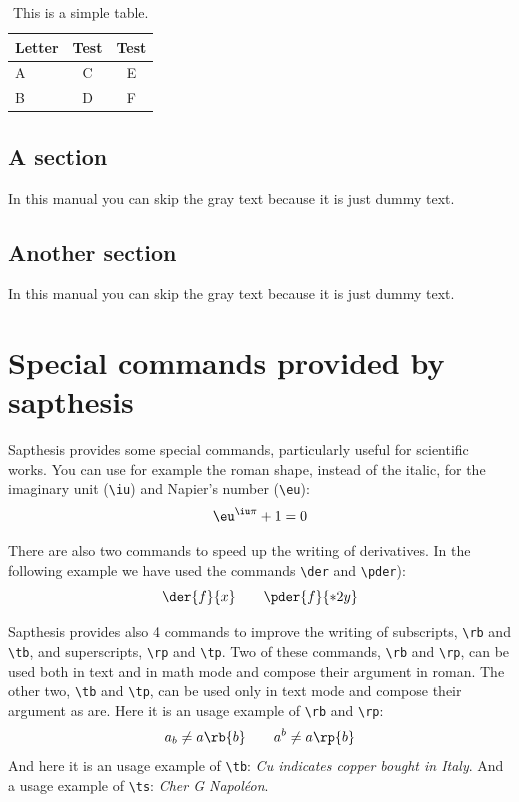 \documentclass[LaM,binding=0.6cm]{sapthesis}
\newcommand{\bs}{\textbackslash}
\begin{document}
\begin{table}
\caption{This is a simple table.}
\label{tab:letters}
\centering
\begin{tabular}{lcc}
\toprule
Letter & Test & Test \\
\midrule
A & C & E \\
B & D & F \\
\bottomrule
\end{tabular}
\end{table}


\section{A section}

In this manual you can skip the gray text because it is just dummy text.

\textcolor{gray}{\lipsum[1-10]}



\section{Another section}

In this manual you can skip the gray text because it is just dummy text.

\textcolor{gray}{\lipsum}


\appendix
\chapter{Special commands provided by \textsf{sapthesis}}

\textsf{Sapthesis} provides some special commands, particularly useful for scientific works. You can use for example the roman shape, instead of the italic, for the imaginary unit (\texttt{\bs iu}) and Napier's number (\texttt{\bs eu}):
\begin{equation}
\eu^{\iu\pi}+1=0
\end{equation}

There are also two commands to speed up the writing of derivatives. In the following example we have used the commands \texttt{\bs der} and \texttt{\bs pder}):
\begin{equation}
\der{f}{x} \qquad \pder{f}{*{2}{y}}
\end{equation}


\textsf{Sapthesis} provides also 4 commands to improve the writing of subscripts, \texttt{\bs rb} and \texttt{\bs tb}, and superscripts, \texttt{\bs rp} and \texttt{\bs tp}. Two of these commands, \texttt{\bs rb} and \texttt{\bs rp}, can be used both in text and in math mode and compose their argument in roman. The other two, \texttt{\bs tb} and \texttt{\bs tp}, can be used only in text mode and compose their argument as are. Here it is an usage example of \texttt{\bs rb} and \texttt{\bs rp}:
\[
a_b \neq a\rb{b}\qquad a^b \neq a\rp{b}
\]
And here it is an usage example of \texttt{\bs tb}: \emph{Cu indicates copper bought in Italy}. And a usage example of \texttt{\bs ts}: \emph{Cher G Napol\'eon}.
\end{document}
